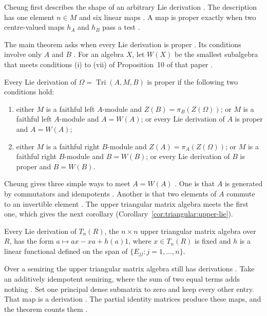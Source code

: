 Cheung first describes the shape of an arbitrary Lie derivation
\cite[Proposition~4, p.~302]{Cheung2003}. The description has one element
$n\in M$ and six linear maps \cite[Proposition~4, p.~302]{Cheung2003}. A map
is proper exactly when two centre-valued maps $h_A$ and $h_B$ pass a test
\cite[Theorem~6, p.~303]{Cheung2003}.

The main theorem asks when every Lie derivation is proper \cite[Theorem~11,
p.~307]{Cheung2003}. Its conditions involve only $A$ and $B$ \cite[Theorem~11,
p.~307]{Cheung2003}. For an algebra $X$, let $W(X)$ be the smallest subalgebra
that meets conditions (i) to (vii) of Proposition~10 of that paper
\cite[Proposition~10, p.~305]{Cheung2003}.

\begin{theorem}\label{thm:triangular:proper-lie}
Every Lie derivation of $\Omega=\operatorname{Tri}(A,M,B)$ is proper if the
following two conditions hold:
\begin{enumerate}
\item either $M$ is a faithful left $A$-module and $Z(B)=\pi_B(Z(\Omega))$; or $M$
is a faithful left $A$-module and $A=W(A)$; or every Lie derivation of $A$ is
proper and $A=W(A)$;
\item either $M$ is a faithful right $B$-module and $Z(A)=\pi_A(Z(\Omega))$; or $M$
is a faithful right $B$-module and $B=W(B)$; or every Lie derivation of $B$ is
proper and $B=W(B)$.
\end{enumerate}
\end{theorem}

Cheung gives three simple ways to meet $A=W(A)$ \cite[p.~307]{Cheung2003}. One
is that $A$ is generated by commutators and idempotents
\cite[p.~307]{Cheung2003}. Another is that two elements of $A$ commute to an
invertible element \cite[p.~307]{Cheung2003}. The upper triangular matrix
algebra meets the first one, which gives the next corollary
(Corollary~\ref{cor:triangular:upper-lie}).

\begin{corollary}\label{cor:triangular:upper-lie}
Every Lie derivation of $T_n(R)$, the $n\times n$ upper triangular matrix algebra
over $R$, has the form $a\mapsto ax-xa+h(a)1$, where $x\in T_n(R)$ is fixed and
$h$ is a linear functional defined on the span of $\{E_{jj}:j=1,\dots,n\}$.
\end{corollary}

Over a semiring the upper triangular matrix algebra still has derivations
\cite[p.~5]{Vladeva2018Semirings}. Take an additively idempotent semiring,
where the sum of two equal terms adds nothing
\cite[p.~2]{Vladeva2018Semirings}. Set one principal dense submatrix to zero
and keep every other entry. That map is a derivation \cite[Theorem~1,
p.~5]{Vladeva2018Semirings}. The partial identity matrices produce these maps,
and the theorem counts them \cite[p.~5]{Vladeva2018Semirings}.

